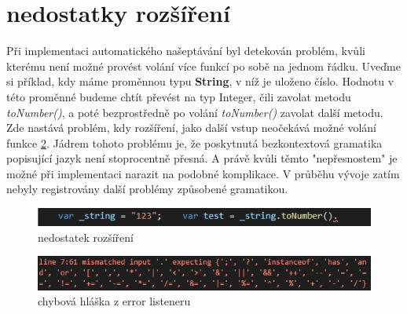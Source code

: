 \section{nedostatky rozšíření}
Při implementaci automatického našeptávání byl detekován problém, kvůli kterému není možné provést volání více funkcí po sobě na jednom řádku. Uveďme si příklad, kdy máme proměnnou typu \textbf{String}, v níž je uloženo číslo. Hodnotu v této proměnné budeme chtít převést na typ Integer, čili zavolat metodu \textit{toNumber()}, a poté bezprostředně po volání \textit{toNumber()} zavolat další metodu. Zde nastává problém, kdy rozšíření, jako další vstup neočekává možné volání funkce \ref{img:autocomplete_errormessage}. Jádrem tohoto problému je, že poskytnutá bezkontextová gramatika popisující jazyk není stoprocentně přesná. A právě kvůli těmto "nepřesnostem" je možné při implementaci narazit na podobné komplikace. V průběhu vývoje zatím nebyly registrovány další problémy způsobené gramatikou.

\begin{figure}
	\centering
	\includegraphics[scale=1]{images/autocomplete_error}
	\caption{nedostatek rozšíření}
	\label{img:autocomplete_error}
\end{figure}

\begin{figure}
	\centering
	\includegraphics[scale=0.8]{images/autocomplete_errormessage}
	\caption{chybová hláška z error listeneru}
	\label{img:autocomplete_errormessage}
\end{figure}
\endinput